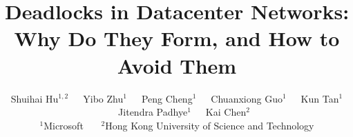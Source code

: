 \documentclass{hotnets16-cr}
\begin{document}


\title{Deadlocks in Datacenter Networks: Why Do They Form, and How to Avoid Them}
\author{Shuihai Hu$^{1,2}$~~~Yibo Zhu$^{1}$~~~Peng Cheng$^{1}$~~~Chuanxiong Guo$^{1}$~~~Kun Tan$^{1}$\\~~~Jitendra Padhye$^{1}$~~~Kai Chen$^{2}$\\ 
$^{1}$Microsoft ~~~$^{2}$Hong Kong University of Science and Technology}
\maketitle












%
\end{document}

